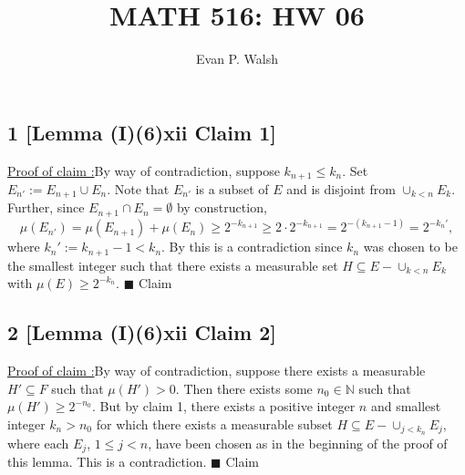 \documentclass[12pt]{article}
\title{MATH 516: HW 06}
\author{Evan P. Walsh}
\newcounter{ProofCounter}
\newcounter{ClaimCounter}[ProofCounter]
\newenvironment{claimproof}[1]{\par\noindent\underline{Proof of claim \theClaimCounter:}\space#1}{\hfill $\blacksquare$ Claim \theClaimCounter}
\begin{document}
\maketitle

\subsection*{1 [Lemma (I)(6)xii Claim 1]}
\begin{claimproof}
By way of contradiction, suppose $k_{n+1} \leq k_{n}$. Set $E_{n'} := E_{n+1}\cup E_{n}$. Note that $E_{n'}$ is a subset of $E$ and is 
disjoint from $\cup_{k < n}E_{k}$. Further, since $E_{n+1}\cap E_{n} = \emptyset$ by construction,
\[ \mu(E_{n'}) = \mu(E_{n+1}) + \mu(E_{n}) \geq 2^{-k_{n+1}} \geq 2\cdot 2^{-k_{n+1}} = 2^{-(k_{n+1}-1)} = 2^{-k_{n}'}, \]
where $k_{n}' := k_{n+1} - 1 < k_{n}$. By this is a contradiction since $k_{n}$ was chosen to be the smallest integer such that there exists a 
measurable set $H \subseteq E - \cup_{k < n}E_{k}$ with $\mu(E) \geq 2^{-k_{n}}$.
\end{claimproof}



\subsection*{2 [Lemma (I)(6)xii Claim 2]}
\begin{claimproof}
By way of contradiction, suppose there exists a measurable $H' \subseteq F$ such that $\mu(H') > 0$. Then there exists some $n_{0} \in \mathbb{N}$ such that 
$\mu(H') \geq 2^{-n_{0}}$. But by claim 1, there exists a positive integer $n$ and smallest integer $k_{n} > n_{0}$ for which there exists a measurable subset $H \subseteq 
E - \cup_{j < k_{n}}E_{j}$, where each $E_{j}$, $1 \leq j < n$, have been chosen as in the beginning of the proof of this lemma. This is a contradiction.
\end{claimproof}


\newpage
\end{document}
